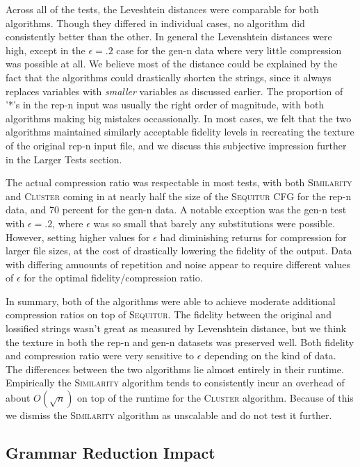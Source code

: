 \documentclass[11pt]{article}
\newcommand{\Sequitur}{\textsc{Sequitur}\xspace}
\newcommand{\Similarity}{\textsc{Similarity}\xspace}
\newcommand{\Cluster}{\textsc{Cluster}\xspace}
\begin{document}
Across all of the tests, the Leveshtein distances were comparable for both
algorithms. Though they differed in individual cases, no algorithm did
consistently better than the other.  In general the Levenshtein distances were
high, except in the $\epsilon=.2$ case for the gen-n data where very little
compression was possible at all.  We believe most of the distance could be
explained by the fact that the algorithms could drastically shorten the
strings, since it always replaces variables with \emph{smaller} variables as
discussed earlier.  The proportion of '*'s in the rep-n input was usually the
right order of magnitude, with both algorithms making big mistakes
occassionally. In most cases, we felt that the two algorithms maintained
similarly acceptable fidelity levels in recreating the texture of the original
rep-n input file, and we discuss this subjective impression further in the
Larger Tests section.

The actual compression ratio was respectable in most tests, with both
\Similarity and \Cluster coming in at nearly half the size of the \Sequitur CFG
for the rep-n data, and 70 percent for the gen-n data. A notable exception was
the gen-n test with $\epsilon=.2$, where $\epsilon$ was so small that barely
any substitutions were possible.  However, setting higher values for $\epsilon$
had diminishing returns for compression for larger file sizes, at the cost of
drastically lowering the fidelity of the output.  Data with differing amuounts
of repetition and noise appear to require different values of $\epsilon$ for
the optimal fidelity/compression ratio.

In summary, both of the algorithms were able to achieve moderate additional
compression ratios on top of \Sequitur. The fidelity between the original and
lossified strings wasn't great as measured by Levenshtein distance, but we
think the texture in both the rep-n and gen-n datasets was preserved well. Both
fidelity and compression ratio were very sensitive to $\epsilon$ depending on
the kind of data.  The differences between the two algorithms lie almost
entirely in their runtime. Empirically the \Similarity algorithm tends to
consistently incur an overhead of about $O(\sqrt{n})$ on top of the runtime for
the \Cluster algorithm. Because of this we dismiss the \Similarity algorithm as
unscalable and do not test it further.

\subsection{Grammar Reduction Impact}
\end{document}
